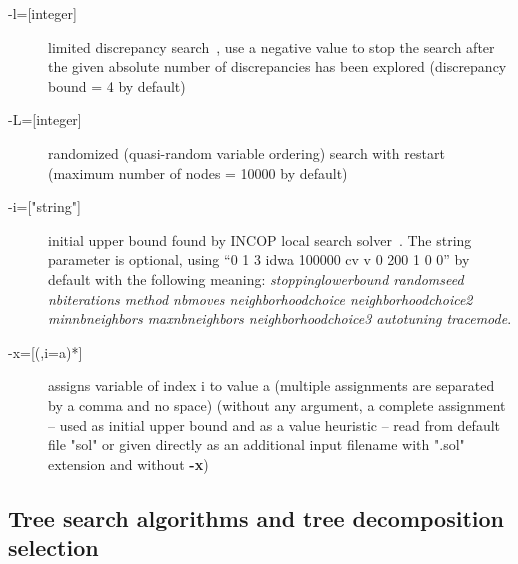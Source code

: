 \documentclass{article}
\begin{document}
\begin{description}
\item[{-l=[integer]}] limited discrepancy search~\cite{Ginsberg95}, use a negative value to stop the search after the given absolute number of discrepancies has been explored (discrepancy bound = 4 by default)
\item[{-L=[integer]}] randomized (quasi-random variable ordering) search with restart (maximum number of nodes = 10000 by default)
\item[{-i=["string"]}] initial upper bound found by INCOP local search
  solver~\cite{idwalk:cp04}. The string parameter is optional, using ``0 1 3 idwa 100000
  cv v 0 200 1 0 0'' by default with the following meaning:
  {\em stoppinglowerbound randomseed nbiterations method nbmoves
  neighborhoodchoice neighborhoodchoice2 minnbneighbors maxnbneighbors
  neighborhoodchoice3 autotuning tracemode}.
\item[{-x=[(,i=a)*]}] assigns variable of index i to value a (multiple
  assignments are separated by a comma and no space) (without any
  argument, a complete assignment -- used as initial upper bound and
  as a value heuristic -- read from default file "sol" or given directly as an additional input
  filename with ".sol" extension and without {\bf -x})
\end{description}

\subsection{Tree search algorithms and tree decomposition selection}
\end{document}
